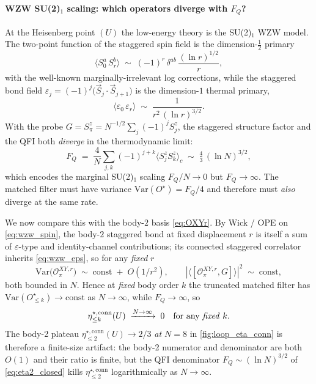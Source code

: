 \documentclass[11pt,a4paper]{article}
\newcommand{\FQ}{F_Q}
\newcommand{\Var}{\mathrm{Var}}
\newcommand{\etaconn}[1]{\eta^{\star,\mathrm{conn}}_{\le #1}}
\begin{document}
\paragraph{WZW SU(2)$_1$ scaling: which operators diverge with $\FQ$?}
At the Heisenberg point $(U)$ the low-energy theory is the
SU(2)$_1$ WZW model.  The two-point function of the staggered
spin field is the dimension-$\tfrac12$ primary
\begin{equation}
   \langle S^a_0\,S^b_r\rangle\;\sim\;
   (-1)^r\,\delta^{ab}\,\frac{(\ln r)^{1/2}}{r},
   \label{eq:wzw_spin}
\end{equation}
with the well-known marginally-irrelevant log corrections, while
the staggered bond field
$\varepsilon_j=(-1)^j\bigl(\vec S_j\!\cdot\!\vec S_{j+1}\bigr)$
is the dimension-$1$ thermal primary,
\begin{equation}
   \langle\varepsilon_0\,\varepsilon_r\rangle\;\sim\;
   \frac{1}{r^2\,(\ln r)^{3/2}}.
   \label{eq:wzw_eps}
\end{equation}
With the probe $G=S^z_\pi=N^{-1/2}\sum_j(-1)^jS^z_j$, the
staggered structure factor and the QFI both \emph{diverge} in
the thermodynamic limit:
\begin{equation}
   \boxed{\;\FQ\;=\;\frac{4}{N}\!\!\sum_{j,k}(-1)^{j+k}
   \langle S^z_jS^z_k\rangle_c\;\sim\;
   \tfrac{4}{3}\,(\ln N)^{3/2},\;}
   \label{eq:FQ_WZW}
\end{equation}
which encodes the marginal SU(2)$_1$ scaling
$F_Q/N\to 0$ but $F_Q\to\infty$.  The matched filter must
have variance $\Var(O^\star)=\FQ/4$ and therefore must
\emph{also} diverge at the same rate.

We now compare this with the body-$2$ basis
\eqref{eq:OXYr}.  By Wick / OPE on \eqref{eq:wzw_spin}, the
body-$2$ staggered bond at fixed displacement $r$ is itself a
sum of $\varepsilon$-type and identity-channel
contributions; its connected staggered correlator inherits
\eqref{eq:wzw_eps}, so for any \emph{fixed} $r$
\begin{equation}
   \Var\!\bigl(\mathcal O^{XY,r}_\pi\bigr)\;\sim\;
   \mathrm{const}\;+\;O(1/r^2),\qquad
   |\langle[\mathcal O^{XY,r}_\pi,G]\rangle|^2\;\sim\;\mathrm{const},
   \label{eq:fixed_r_scaling}
\end{equation}
both bounded in $N$.  Hence at \emph{fixed} body order $k$ the
truncated matched filter has
$\Var(O^\star_{\le k})\to\mathrm{const}$ as $N\to\infty$, while
$\FQ\to\infty$, so
\begin{equation}
   \etaconn{k}(U)\;\xrightarrow{N\to\infty}\;0
   \quad\text{for any \emph{fixed} }k.
   \label{eq:eta_fixed_k_to_zero}
\end{equation}
The body-2 plateau $\etaconn{2}(U)\to 2/3$ \emph{at $N=8$} in
\cref{fig:loop_eta_conn} is therefore a finite-size artifact:
the body-2 numerator and denominator are both $O(1)$ and their
ratio is finite, but the QFI denominator $\FQ\sim(\ln N)^{3/2}$
of \eqref{eq:eta2_closed} kills $\etaconn{2}$ logarithmically as
$N\!\to\!\infty$.
\end{document}
